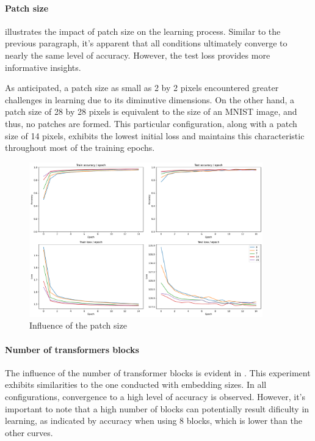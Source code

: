 \paragraph{Patch size}
 illustrates the impact of patch size on the learning process. Similar to the previous paragraph, it's apparent that all conditions ultimately converge to nearly the same level of accuracy. However, the test loss provides more informative insights.

As anticipated, a patch size as small as 2 by 2 pixels encountered greater challenges in learning due to its diminutive dimensions. On the other hand, a patch size of 28 by 28 pixels is equivalent to the size of an MNIST image, and thus, no patches are formed. This particular configuration, along with a patch size of 14 pixels, exhibits the lowest initial loss and maintains this characteristic throughout most of the training epochs.

\begin{figure}[H]
    \centering
    \includegraphics*[width=0.9\textwidth]{figs/Transformers/patch_size_influence.pdf}
    \caption{Influence of the patch size}
    \label{fig:patch_size_influence}
\end{figure}

\paragraph{Number of transformers blocks}
The influence of the number of transformer blocks is evident in . This experiment exhibits similarities to the one conducted with embedding sizes. In all configurations, convergence to a high level of accuracy is observed. However, it's important to note that a high number of blocks can potentially result dificulty in learning, as indicated by accuracy when using 8 blocks, which is lower than the other curves.

